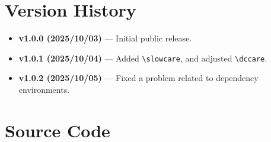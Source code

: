 \documentclass[luatex,fontsize=10pt,paper=b5,twoside]{jlreq}%
\begin{document}

\section{Version History}

\begin{itemize}
    \item \textbf{v1.0.0 (2025/10/03)} --- Initial public release.
    \item \textbf{v1.0.1 (2025/10/04)} --- Added \verb|\slowcare|, and adjusted \verb|\dccare|.
    \item \textbf{v1.0.2 (2025/10/05)} --- Fixed a problem related to dependency environments.
\end{itemize}

\section{Source Code}
\end{document}
